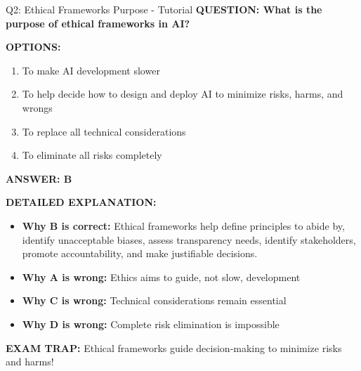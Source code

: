\documentclass[8pt]{beamer}
\begin{document}
	\begin{frame}{Q2: Ethical Frameworks Purpose - Tutorial}
		\fontsize{6.5}{7.5}\selectfont
		\textbf{QUESTION: What is the purpose of ethical frameworks in AI?}
		
		\vspace{0.1cm}
		\textbf{OPTIONS:}
		\begin{enumerate}
			\item To make AI development slower
			\item To help decide how to design and deploy AI to minimize risks, harms, and wrongs
			\item To replace all technical considerations
			\item To eliminate all risks completely
		\end{enumerate}
		
		\vspace{0.1cm}
		\textcolor{myblue}{\textbf{ANSWER: B}}
		
		\vspace{0.1cm}
		\textbf{DETAILED EXPLANATION:}
		\begin{itemize}
			\item \textbf{Why B is correct:} Ethical frameworks help define principles to abide by, identify unacceptable biases, assess transparency needs, identify stakeholders, promote accountability, and make justifiable decisions.
			\item \textbf{Why A is wrong:} Ethics aims to guide, not slow, development
			\item \textbf{Why C is wrong:} Technical considerations remain essential
			\item \textbf{Why D is wrong:} Complete risk elimination is impossible
		\end{itemize}
		
		\textcolor{myred}{\textbf{EXAM TRAP:}} Ethical frameworks \textcolor{myblue}{guide decision-making} to minimize risks and harms!
	\end{frame}
	
\end{document}
